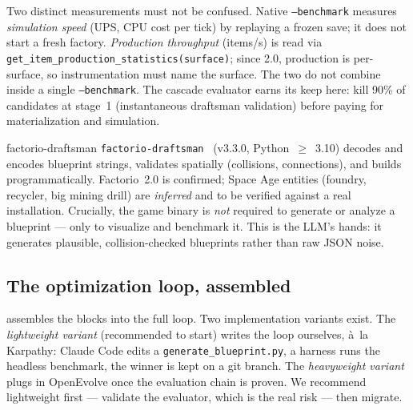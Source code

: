 \documentclass[11pt,a4paper]{article}
\begin{document}
Two distinct measurements must not be confused. Native \texttt{--benchmark}
measures \emph{simulation speed} (UPS, CPU cost per tick) by replaying a frozen
save; it does not start a fresh factory. \emph{Production throughput} (items/s) is
read via \texttt{get\_item\_production\_statistics(surface)}; since 2.0,
production is per-surface, so instrumentation must name the surface. The two do
not combine inside a single \texttt{--benchmark}. The cascade evaluator earns its
keep here: kill 90\% of candidates at stage~1 (instantaneous draftsman
validation) before paying for materialization and simulation.

\begin{toolbox}{factorio-draftsman}
\texttt{factorio-draftsman}~\cite{draftsman_github,draftsman_pypi} (v3.3.0,
Python~$\geq$~3.10) decodes and encodes blueprint strings, validates spatially
(collisions, connections), and builds programmatically. Factorio~2.0 is
confirmed; Space Age entities (foundry, recycler, big mining drill) are
\emph{inferred} and to be verified against a real installation. Crucially, the
game binary is \emph{not} required to generate or analyze a blueprint --- only to
visualize and benchmark it. This is the LLM's hands: it generates plausible,
collision-checked blueprints rather than raw JSON noise.
\end{toolbox}

\subsection{The optimization loop, assembled}

 assembles the blocks into the full loop. Two implementation
variants exist. The \emph{lightweight variant} (recommended to start) writes the
loop ourselves, à~la Karpathy: Claude Code edits a \texttt{generate\_blueprint.py},
a harness runs the headless benchmark, the winner is kept on a git branch. The
\emph{heavyweight variant} plugs in OpenEvolve once the evaluation chain is
proven. We recommend lightweight first --- validate the evaluator, which is the
real risk --- then migrate.
\end{document}
